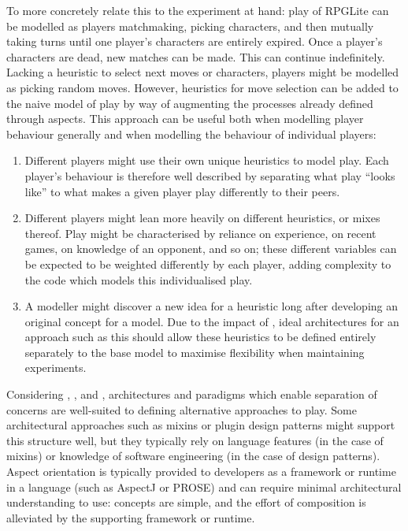 To more concretely relate this to the experiment at hand: play of RPGLite can be
modelled as players matchmaking, picking characters, and then mutually taking
turns until one player's characters are entirely expired. Once a player's
characters are dead, new matches can be made. This can continue indefinitely.
Lacking a heuristic to select next moves or characters, players might be
modelled as picking random moves. However, heuristics for move selection can be
added to the naive model of play by way of augmenting the processes already
defined through aspects. This approach can be useful both when
modelling player behaviour generally and when modelling the behaviour of
individual players: 

\begin{enumerate}
    \item Different players might use their own unique heuristics to model play.
    Each player's behaviour is therefore well described by separating what play
    ``looks like'' to what makes a given player play differently to their peers.
    \item Different players might lean more heavily on different heuristics, or
    mixes thereof. Play might be characterised by reliance on experience, on
    recent games, on knowledge of an opponent, and so on; these different
    variables can be expected to be weighted differently by each player, adding
    complexity to the code which models this individualised play.
    \item A modeller might discover a new idea for a heuristic long after
    developing an original concept for a model. Due
    to the impact of , ideal architectures for an approach such as
    this should allow these heuristics to be defined entirely separately to
    the base model to maximise flexibility when maintaining experiments.
\end{enumerate}

Considering , , and , architectures and
paradigms which enable separation of concerns are well-suited to defining
alternative approaches to play. Some architectural approaches such as mixins or
plugin design patterns might support this structure well, but they typically
rely on language features (in the case of mixins) or knowledge of software
engineering (in the case of design patterns). Aspect orientation is typically
provided to developers as a framework or runtime in a language (such as
AspectJ\cite{aspectj_intro} or PROSE\cite{popovici2002PROSE}) and can require
minimal architectural understanding to use: concepts are simple, and the effort
of composition is alleviated by the supporting framework or runtime.


